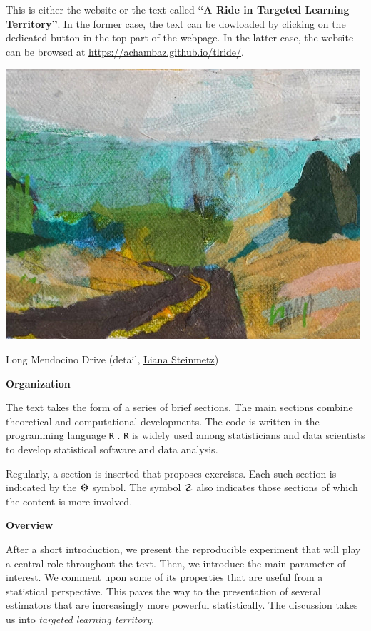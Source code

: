 \documentclass[11pt,openright,twoside]{book}
\newcommand{\gear}{\usebox{\gearbox}\;}
\DeclareRobustCommand{\stixdanger}{%
  {\usefont{U}{stixbbit}{m}{it}\symbol{"F6}}%
}
\theoremstyle{definition}
\theoremstyle{definition}
\theoremstyle{definition}
\theoremstyle{remark}
\begin{document}
This is either the website or the text called \textbf{``A Ride in Targeted Learning
Territory''}. In the former case, the text can be dowloaded by clicking on the
dedicated button in the top part of the webpage. In the latter case, the
website can be browsed at
\url{https://achambaz.github.io/tlride/}.

\begin{center}\includegraphics[width=0.7\linewidth]{cover} \end{center}

\begin{center}
Long Mendocino Drive (detail,
\href{https://www.lianasteinmetz.com/}{Liana Steinmetz})
\end{center}

\textbf{Organization}

The text takes the form of a series of brief sections. The main sections
combine theoretical and computational developments. The code is written in the
programming language \href{https://www.r-project.org}{\texttt{R}} \citep{R}. \texttt{R} is widely
used among statisticians and data scientists to develop statistical software
and data analysis.

Regularly, a section is inserted that proposes exercises. Each such section
is indicated by the {⚙} \gear symbol. The
symbol {☡} \stixdanger{} also indicates
those sections of which the content is more involved.

\textbf{Overview}

After a short introduction, we present the reproducible experiment that will
play a central role throughout the text. Then, we introduce the main parameter
of interest. We comment upon some of its properties that are useful from a
statistical perspective. This paves the way to the presentation of several
estimators that are increasingly more powerful statistically. The discussion
takes us into \emph{targeted learning territory}.
\end{document}

